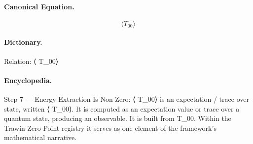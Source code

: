 \paragraph{Canonical Equation.}
\[
\langle T_{00}\rangle
\]

\paragraph{Dictionary.}
Relation: ⟨ T\_00⟩

\paragraph{Encyclopedia.}
Step 7 — Energy Extraction Is Non-Zero: ⟨ T\_00⟩ is an expectation / trace over state, written ⟨ T\_00⟩. It is computed as an expectation value or trace over a quantum state, producing an observable. It is built from T\_00. Within the Trawin Zero Point registry it serves as one element of the framework's mathematical narrative.
